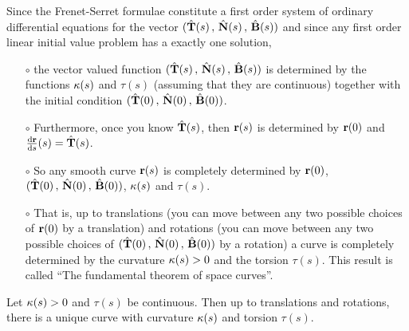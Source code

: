 Since the Frenet-Serret formulae constitute a first order system of ordinary
differential equations for the vector 
$(\hat{\mathbf{T}}(s)\,,\,\hat{\mathbf{N}}(s)\,,\,\hat{\mathbf{B}}(s))$ and since any first order linear 
initial value problem has a exactly one solution,
\begin{itemize}\itemsep1pt \parskip0pt  %
\item[$\circ$] 
the vector valued function $(\hat{\mathbf{T}}(s)\,,\,\hat{\mathbf{N}}(s)\,,\,\hat{\mathbf{B}}(s))$ 
is determined by the functions
$\kappa(s)$ and $\tau(s)$ (assuming that they are continuous) together with 
the initial condition $(\hat{\mathbf{T}}(0)\,,\,\hat{\mathbf{N}}(0)\,,\,\hat{\mathbf{B}}(0))$.
\item[$\circ$] Furthermore, once you know $\hat{\mathbf{T}}(s)$, then
$\mathbf{r}(s)$ is determined by $\mathbf{r}(0)$ and $\diff{\vr}{s}(s)=\hat\vT(s)$.
\item[$\circ$] So any smooth curve $\mathbf{r}(s)$ is completely determined
by $\mathbf{r}(0)$, $(\hat{\mathbf{T}}(0)\,,\,\hat{\mathbf{N}}(0)\,,\,\hat{\mathbf{B}}(0))$, $\kappa(s)$
and $\tau(s)$. 
\item[$\circ$] That is, up to translations (you can move between any two 
possible choices of $\mathbf{r}(0)$ by  a translation) and rotations
(you can move between any two possible choices of 
$(\hat{\mathbf{T}}(0)\,,\,\hat{\mathbf{N}}(0)\,,\,\hat{\mathbf{B}}(0))$ by  a rotation) a curve is       completely determined by the curvature $\kappa(s)>0$ and the torsion 
$\tau(s)$. This result is called ``The fundamental theorem of space curves''.

\end{itemize}

\begin{theorem}
Let $\kappa(s)>0$ and $\tau(s)$ be continuous. Then up to translations
and rotations, there is a unique curve with curvature $\kappa(s)$ and
torsion $\tau(s)$.
\end{theorem}

